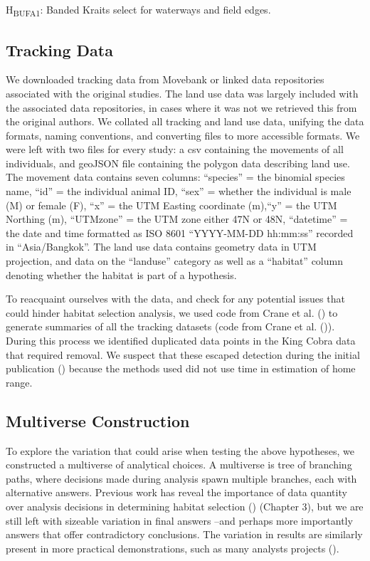 \documentclass[10pt,a4paper]{article}
\begin{document}
H\textsubscript{BUFA1}: Banded Kraits select for waterways and field edges.

\subsection{Tracking Data}\label{tracking-data}

We downloaded tracking data from Movebank or linked data repositories associated with the original studies.
The land use data was largely included with the associated data repositories, in cases where it was not we retrieved this from the original authors.
We collated all tracking and land use data, unifying the data formats, naming conventions, and converting files to more accessible formats.
We were left with two files for every study: a csv containing the movements of all individuals, and geoJSON file containing the polygon data describing land use.
The movement data contains seven columns: ``species'' = the binomial species name, ``id'' = the individual animal ID, ``sex'' = whether the individual is male (M) or female (F), ``x'' = the UTM Easting coordinate (m),``y'' = the UTM Northing (m), ``UTMzone'' = the UTM zone either 47N or 48N, ``datetime'' = the date and time formatted as ISO 8601 ``YYYY-MM-DD hh:mm:ss'' recorded in ``Asia/Bangkok''.
The land use data contains geometry data in UTM projection, and data on the ``landuse'' category as well as a ``habitat'' column denoting whether the habitat is part of a hypothesis.

To reacquaint ourselves with the data, and check for any potential issues that could hinder habitat selection analysis, we used code from Crane et al. () to generate summaries of all the tracking datasets (code from Crane et al. ()).
During this process we identified duplicated data points in the King Cobra data that required removal.
We suspect that these escaped detection during the initial publication () because the methods used did not use time in estimation of home range.

\subsection{Multiverse Construction}\label{multiverse-construction}

To explore the variation that could arise when testing the above hypotheses, we constructed a multiverse of analytical choices.
A multiverse is tree of branching paths, where decisions made during analysis spawn multiple branches, each with alternative answers.
Previous work has reveal the importance of data quantity over analysis decisions in determining habitat selection () (Chapter 3), but we are still left with sizeable variation in final answers --and perhaps more importantly answers that offer contradictory conclusions.
The variation in results are similarly present in more practical demonstrations, such as many analysts projects ().
\end{document}
